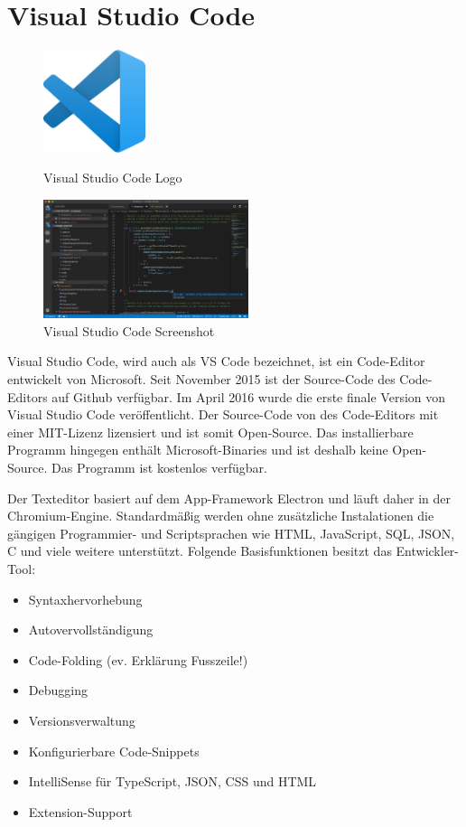 \section{Visual Studio Code}
\author{Stefano Pyringer}

\begin{figure}[htb]
    \begin{center}
        \includegraphics[width=3cm] {./pics/Visual_Studio_Code_1.35_icon.svg.png}
        \caption{Visual Studio Code Logo}
        \includegraphics[width=6cm]{./pics/VS_Code_1.36.0-insider.png}
        \caption{Visual Studio Code Screenshot}
    \end{center}
\end{figure}

Visual Studio Code, wird auch als VS Code bezeichnet, ist ein Code-Editor entwickelt von Microsoft. 
Seit November 2015 ist der Source-Code des Code-Editors auf Github verfügbar. Im April 2016 wurde die erste finale Version 
von Visual Studio Code veröffentlicht. Der Source-Code von des Code-Editors mit einer MIT-Lizenz lizensiert und ist somit Open-Source.
Das installierbare Programm hingegen enthält Microsoft-Binaries und ist deshalb keine Open-Source. Das Programm ist kostenlos verfügbar.

Der Texteditor basiert auf dem App-Framework Electron und läuft daher in der Chromium-Engine. Standardmäßig werden ohne zusätzliche Instalationen
die gängigen Programmier- und Scriptsprachen wie HTML, JavaScript, SQL, JSON, C und viele weitere unterstützt. 
Folgende Basisfunktionen besitzt das Entwickler-Tool:

\begin{itemize}
    \item Syntaxhervorhebung
    \item Autovervollständigung
    \item Code-Folding (ev. Erklärung Fusszeile!)
    \item Debugging
    \item Versionsverwaltung
    \item Konfigurierbare Code-Snippets
    \item IntelliSense für TypeScript, JSON, CSS und HTML
    \item Extension-Support
\end{itemize}

